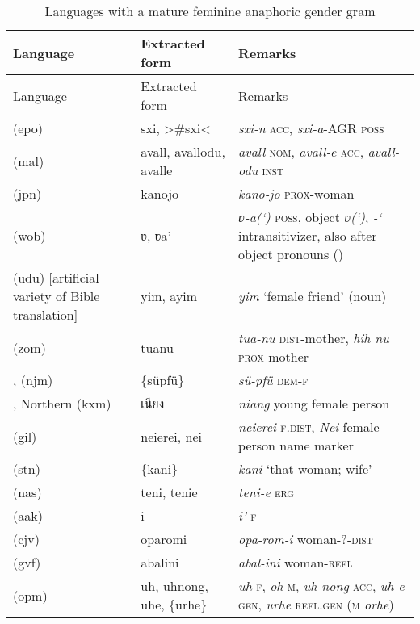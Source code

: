 {\small\begin{longtable}{L{.25\textwidth}L{.25\textwidth}L{.5\textwidth}}
\caption{Languages with a mature feminine anaphoric gender gram}\\
\lsptoprule Language & Extracted form & Remarks\\\midrule\endfirsthead
\midrule    Language & Extracted form & Remarks\\\midrule\endhead
\endfoot\lspbottomrule\endlastfoot
{} (epo)	&	sxi, >\#sxi<	&	\textit{sxi-n} \textsc{acc}, \textit{sxi-a}-AGR \textsc{poss}	\\
 (mal)	&	avall, avallodu, avalle	&	\textit{avall} \textsc{nom}, \textit{avall-e} \textsc{acc}, \textit{avall-odu} \textsc{inst}	\\
 (jpn)	&	kanojo	&	\textit{kano-jo} \textsc{prox}-woman	\\
 (wob)	&	ʋ, ʋa’	&	\textit{ʋ-a(‘)} \textsc{poss}, object \textit{ʋ(‘)}, \textit{-‘} intransitivizer, also after object pronouns (\citealt{Paradis1983})	\\
 (udu) [artificial variety of Bible translation]	&	yim, ayim	&	\textit{yim} ‘female friend’ (noun)	\\
 (zom)	&	tuanu	&	\textit{tua-nu} \textsc{dist}-mother, \textit{hih nu} \textsc{prox} mother	\\
,  (njm)	&	\{süpfü\}	&	\textit{sü-pfü} \textsc{dem-f}	\\
, Northern (kxm)	&	\textkhmer{เนียง}	&	\textit{niang} young female person 	\\
 (gil)	&	neierei, nei	&	\textit{neierei} \textsc{f.dist}, \textit{Nei} female person name marker	\\
 (stn)	&	\{kani\}	&	\textit{kani} ‘that woman; wife’	\\
 (nas)	&	teni, tenie	&	\textit{teni-e} \textsc{erg}	\\
 (aak)	&	i\textquotesingle{}	&	\textit{i’} \textsc{f}	\\
 (cjv)	&	oparomi	&	\textit{opa-rom-i} woman-?-\textsc{dist}	\\
 (gvf)	&	abalini	&	\textit{abal-ini} woman-\textsc{refl}	\\
 (opm)	&	uh, uhnong, uhe, \{urhe\}	&	\textit{uh} \textsc{f}, \textit{oh} \textsc{m}, \textit{uh-nong} \textsc{acc}, \textit{uh-e} \textsc{gen}, \textit{urhe} \textsc{refl.gen} (\textsc{m} \textit{orhe})	\\

\end{longtable}}
